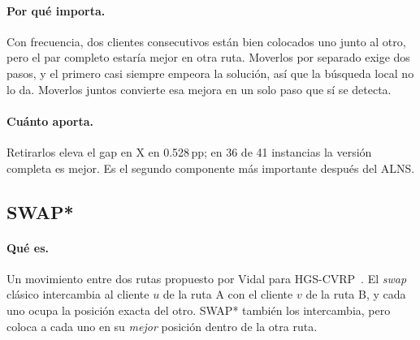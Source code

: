 \documentclass[11pt,a4paper]{article}
\newcommand{\pp}{\,pp}
\begin{document}
\paragraph{Por qué importa.} Con frecuencia, dos clientes consecutivos están bien colocados uno
junto al otro, pero el par completo estaría mejor en otra ruta. Moverlos por separado exige dos
pasos, y el primero casi siempre empeora la solución, así que la búsqueda local no lo da. Moverlos
juntos convierte esa mejora en un solo paso que sí se detecta.

\paragraph{Cuánto aporta.} Retirarlos eleva el gap en X en 0.528\pp{}; en 36 de 41 instancias la
versión completa es mejor. Es el segundo componente más importante después del ALNS.

\subsection{SWAP*}
\label{sec:swapstar}

\paragraph{Qué es.} Un movimiento entre dos rutas propuesto por Vidal para HGS-CVRP~\cite{vidal2022hgs}.
El \emph{swap} clásico intercambia al cliente $u$ de la ruta A con el cliente $v$ de la ruta B, y
cada uno ocupa la posición exacta del otro. SWAP* también los intercambia, pero coloca a cada uno en
su \emph{mejor} posición dentro de la otra ruta.
\end{document}

